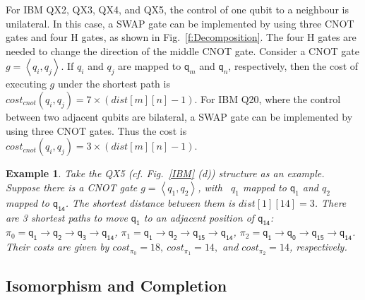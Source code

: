 \documentclass[journal]{IEEEtran}
\newtheorem{example}{Example}[section]
\begin{document}
For IBM QX2, QX3, QX4, and QX5, the control of one qubit to a neighbour is unilateral. In this case, 
a SWAP gate can be implemented by using three CNOT gates and four H gates, as shown in Fig.~\ref{f:Decomposition}. The four H gates are needed to change the direction of the middle CNOT gate. 
Consider a CNOT gate $g=\left \langle  \textit{q}_\textit{i},\textit{q}_\textit{j} \right \rangle $. If $q_i$ and $q_j$  are mapped to $\textsf{q}_{m}$ and $\textsf{q}_{n}$, respectively, then the cost of executing $g$ under the shortest path is $cost_{cnot}(\textit{q}_\textit{i},\textit{q}_\textit{j})=7 \times( dist[m][n]-1)$. For IBM Q20, where the control between two adjacent qubits are bilateral, a SWAP gate can be implemented by using three CNOT gates. Thus the cost  is $cost_{cnot}(\textit{q}_\textit{i},\textit{q}_\textit{j})=3 \times( dist[m][n]-1)$. 
\begin{example}
	Take the QX5 (cf. Fig.~\ref{IBM} (d))    structure  as an example. Suppose there is a CNOT gate $g=\left \langle  \textit{q}_\textit{1}, \textit{q}_\textit{2} \right \rangle $, with \ $\textit{q}_\textit{1}$ mapped to $\textsf{q}_{1}$ and $\textit{q}_\textit{2}$ mapped to $\textsf{q}_{\textsf{14}}$. The shortest distance between them  is $dist[1][14]=3$. There are 3 shortest paths to move $\textsf{q}_{\textsf{1}}$ to an adjacent position of 
$\textsf{q}_{\textsf{14}}$:
$\pi_{0}={\textsf{q}_{\textsf{1}}\rightarrow \textsf{q}_{\textsf{2}} \rightarrow \textsf{q}_{\textsf{3}} \rightarrow \textsf{q}_{\textsf{14}}}$,
$\pi_{1}={\textsf{q}_{\textsf{1}}\rightarrow \textsf{q}_{\textsf{2}} \rightarrow \textsf{q}_{\textsf{15}} \rightarrow \textsf{q}_{\textsf{14}}}$,
$\pi_{2}={\textsf{q}_{\textsf{1}}\rightarrow \textsf{q}_{\textsf{0}} \rightarrow \textsf{q}_{\textsf{15}} \rightarrow \textsf{q}_{\textsf{14}}}$.
Their costs are given by 
$cost_{\pi_{0}}=18,\ cost_{\pi_{1}}=14,$ and $ cost_{\pi_{2}}=14$, respectively.
\end{example}



\subsection{Isomorphism and Completion}
\end{document}
